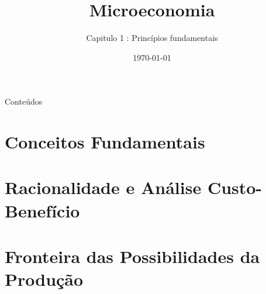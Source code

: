 \documentclass[table]{beamer}
\title{Microeconomia}
\subtitle{Capitulo 1 : Princ\'ipios fundamentais}
\author[]{}
\institute[ISCAL]{\texttt{[image: ../visual material/logo\_eng\_full.png]}}
\date{\today}
\begin{document}
{
\begin{frame}
	\maketitle
\end{frame}
}

\begin{frame}{Conte\'udos}
  \tableofcontents
\end{frame}

\section{Conceitos Fundamentais}

\section{Racionalidade e An\'alise Custo-Benef\'icio}

\section{Fronteira das Possibilidades da Produ\c c\~ao}

% 
\end{document}
